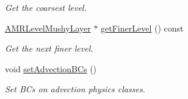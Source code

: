 \begin{DoxyCompactItemize}
\begin{DoxyCompactList}\small\item\em Get the coarsest level. \end{DoxyCompactList}\item 
\hypertarget{class_a_m_r_level_mushy_layer_ae020365cfbaac92f38f32633dcbbc436}{\hyperlink{class_a_m_r_level_mushy_layer}{A\-M\-R\-Level\-Mushy\-Layer} $\ast$ \hyperlink{class_a_m_r_level_mushy_layer_ae020365cfbaac92f38f32633dcbbc436}{get\-Finer\-Level} () const }\label{class_a_m_r_level_mushy_layer_ae020365cfbaac92f38f32633dcbbc436}

\begin{DoxyCompactList}\small\item\em Get the next finer level. \end{DoxyCompactList}\item 
\hypertarget{class_a_m_r_level_mushy_layer_aa8b1365bdf67cc5b82bec6c04a25f6a0}{void \hyperlink{class_a_m_r_level_mushy_layer_aa8b1365bdf67cc5b82bec6c04a25f6a0}{set\-Advection\-B\-Cs} ()}\label{class_a_m_r_level_mushy_layer_aa8b1365bdf67cc5b82bec6c04a25f6a0}

\begin{DoxyCompactList}\small\item\em Set B\-Cs on advection physics classes. \end{DoxyCompactList}\end{DoxyCompactItemize}
